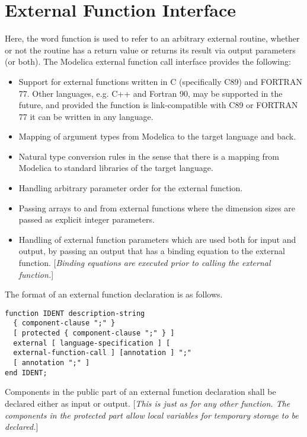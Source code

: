 \section{External Function Interface}

Here, the word function is used to refer to an arbitrary external
routine, whether or not the routine has a return value or returns its
result via output parameters (or both). The Modelica external function
call interface provides the following:

\begin{itemize}
\item
  Support for external functions written in C (specifically C89) and
  FORTRAN 77. Other languages, e.g. C++ and Fortran 90, may be supported
  in the future, and provided the function is link-compatible with C89
  or FORTRAN 77 it can be written in any language.
\item
  Mapping of argument types from Modelica to the target language and
  back.
\item
  Natural type conversion rules in the sense that there is a mapping
  from Modelica to standard libraries of the target language.
\item
  Handling arbitrary parameter order for the external function.
\item
  Passing arrays to and from external functions where the dimension
  sizes are passed as explicit integer parameters.
\item
  Handling of external function parameters which are used both for input
  and output, by passing an output that has a binding equation to
  the external function. {[}\emph{Binding equations are executed
  prior to calling the external function.}{]}
\end{itemize}

The format of an external function declaration is as follows.

\begin{lstlisting}[language=grammar]
function IDENT description-string
  { component-clause ";" }
  [ protected { component-clause ";" } ]
  external [ language-specification ] [
  external-function-call ] [annotation ] ";"
  [ annotation ";" ]
end IDENT;
\end{lstlisting}
Components in the public part of an external function declaration shall
be declared either as input or output. {[}\emph{This is just as for any
other function. The components in the protected part allow local
variables for temporary storage to be declared.}{]}

